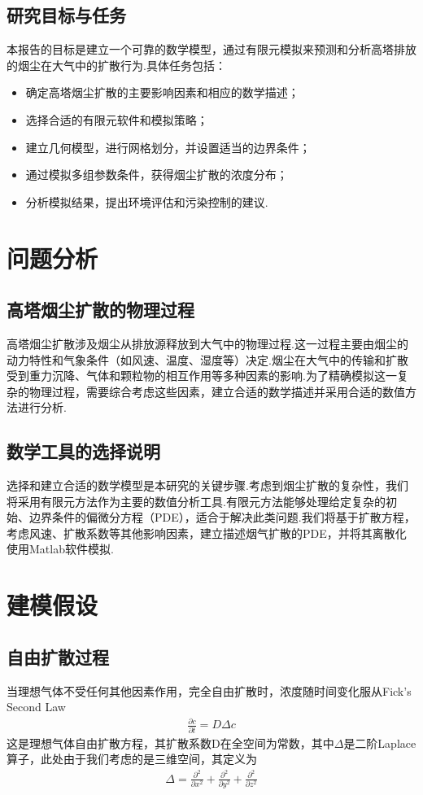 \documentclass{article}
\begin{document}
	\subsection{研究目标与任务}
	本报告的目标是建立一个可靠的数学模型，通过有限元模拟来预测和分析高塔排放的烟尘在大气中的扩散行为.具体任务包括：
	\begin{itemize}
		\item 确定高塔烟尘扩散的主要影响因素和相应的数学描述；
		\item 选择合适的有限元软件和模拟策略；
		\item 建立几何模型，进行网格划分，并设置适当的边界条件；
		\item 通过模拟多组参数条件，获得烟尘扩散的浓度分布；
		\item 分析模拟结果，提出环境评估和污染控制的建议.
	\end{itemize}
	
	\section{问题分析}
	\subsection{高塔烟尘扩散的物理过程}
	高塔烟尘扩散涉及烟尘从排放源释放到大气中的物理过程.这一过程主要由烟尘的动力特性和气象条件（如风速、温度、湿度等）决定.烟尘在大气中的传输和扩散受到重力沉降、气体和颗粒物的相互作用等多种因素的影响.为了精确模拟这一复杂的物理过程，需要综合考虑这些因素，建立合适的数学描述并采用合适的数值方法进行分析.
	
	\subsection{数学工具的选择说明}
	选择和建立合适的数学模型是本研究的关键步骤.考虑到烟尘扩散的复杂性，我们将采用有限元方法作为主要的数值分析工具.有限元方法能够处理给定复杂的初始、边界条件的偏微分方程（PDE），适合于解决此类问题.我们将基于扩散方程，考虑风速、扩散系数等其他影响因素，建立描述烟气扩散的PDE，并将其离散化使用Matlab软件模拟.
	
	\section{建模假设}
	\subsection{自由扩散过程}\noindent
	当理想气体不受任何其他因素作用，完全自由扩散时，浓度随时间变化服从Fick's Second Law
	\begin{align*}
		\frac{\partial c}{\partial t} = D\Delta c
	\end{align*}
	这是理想气体自由扩散方程，其扩散系数D在全空间为常数，其中$\Delta$是二阶Laplace算子，此处由于我们考虑的是三维空间，其定义为
	\begin{align*}
		\Delta = \frac{\partial^2}{\partial x^2}+\frac{\partial^2}{\partial y^2}+\frac{\partial^2}{\partial z^2}
	\end{align*}
	
\end{document}
